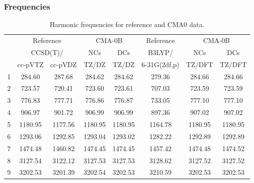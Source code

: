 \documentclass[10pt,oneside]{article}
\begin{document}
\subsubsection*{Frequencies}
\begin{table}[h!]
\centering
\caption{Harmonic frequencies for reference and CMA0 data.}
\begin{tabular}{cccccccc}
\toprule
{} & \multicolumn{2}{c}{Reference} & \multicolumn{2}{c}{CMA-0B} &    Reference & \multicolumn{2}{c}{CMA-0B} \\
{} & \multicolumn{2}{c}{CCSD(T)/} &     NCs &     DCs &       B3LYP/ &     NCs &     DCs \\
{} &   cc-pVTZ & cc-pVDZ &   TZ/DZ &   TZ/DZ & 6-31G(2df,p) &  TZ/DFT &  TZ/DFT \\
\midrule
1 &    284.60 &  287.68 &  284.62 &  284.62 &       279.36 &  284.66 &  284.66 \\
2 &    723.57 &  720.41 &  723.60 &  723.61 &       707.03 &  723.59 &  723.59 \\
3 &    776.83 &  777.71 &  776.86 &  776.87 &       733.05 &  777.10 &  777.10 \\
4 &    906.97 &  901.72 &  906.99 &  906.99 &       897.36 &  907.02 &  907.02 \\
5 &   1180.95 & 1177.56 & 1180.95 & 1180.95 &      1164.78 & 1180.95 & 1180.95 \\
6 &   1293.06 & 1292.85 & 1293.04 & 1293.02 &      1282.22 & 1292.89 & 1292.89 \\
7 &   1474.48 & 1460.82 & 1474.45 & 1474.45 &      1457.42 & 1474.48 & 1474.52 \\
8 &   3127.54 & 3122.12 & 3127.53 & 3127.53 &      3128.62 & 3127.52 & 3127.52 \\
9 &   3202.53 & 3201.39 & 3202.54 & 3202.53 &      3210.59 & 3202.53 & 3202.53 \\
\bottomrule
\end{tabular}
\end{table}

\clearpage
\end{document}
